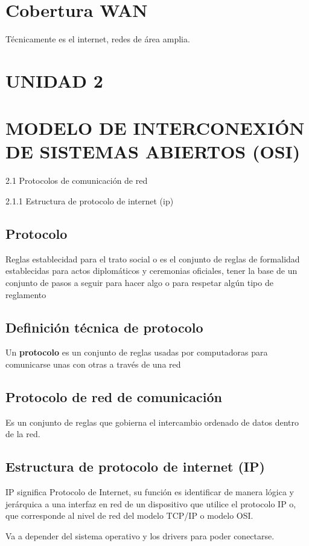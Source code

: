 \documentclass[letterpaper,12pt]{article}
\begin{document}
\begin{sloppypar}
\section{Cobertura WAN}
Técnicamente es el internet, redes de área amplia.
\newpage
\section*{UNIDAD 2}
\section{MODELO DE INTERCONEXIÓN DE SISTEMAS ABIERTOS (OSI)}
2.1 Protocolos de comunicación de red

2.1.1 Estructura de protocolo de internet (ip)

\subsection{Protocolo}
Reglas establecidad para el trato social o es el conjunto de reglas de formalidad establecidas para actos diplomáticos y ceremonias oficiales, tener la base de un conjunto de pasos a seguir para hacer algo o para respetar algún tipo de reglamento

\subsection{Definición técnica de protocolo}
Un \textbf{protocolo} es un conjunto de reglas usadas por computadoras para comunicarse unas con otras a través de una red

\subsection{Protocolo de red de comunicación}
Es un conjunto de reglas que gobierna el intercambio ordenado de datos dentro de la red.

\subsection{Estructura de protocolo de internet (IP)}
IP significa Protocolo de Internet, su función es identificar de manera lógica y jerárquica a una interfaz en red de un dispositivo que utilice el protocolo IP o, que corresponde al nivel de red del modelo TCP/IP o modelo OSI.

Va a depender del sistema operativo y los drivers para poder conectarse. 


\end{sloppypar}
\end{document}
